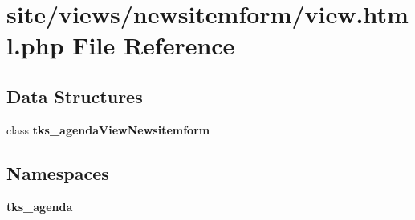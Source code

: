 \section{site/views/newsitemform/view.html.\+php File Reference}
\label{site_2views_2newsitemform_2view_8html_8php}
\subsection*{Data Structures}
\begin{DoxyCompactItemize}
\item 
class \textbf{ tks\+\_\+agenda\+View\+Newsitemform}
\end{DoxyCompactItemize}
\subsection*{Namespaces}
\begin{DoxyCompactItemize}
\item 
 \textbf{ tks\+\_\+agenda}
\end{DoxyCompactItemize}
